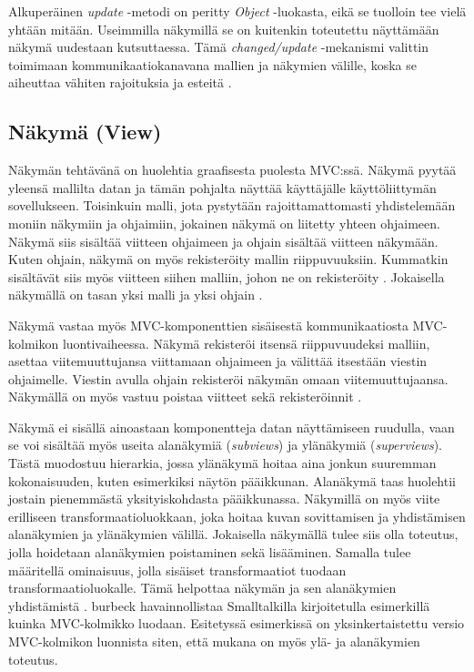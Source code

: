 \documentclass[utf8]{gradu3}
\begin{document}
Alkuperäinen \textit{update} -metodi on peritty \textit{Object} -luokasta, eikä se tuolloin tee vielä yhtään mitään. Useimmilla näkymillä se on kuitenkin toteutettu näyttämään näkymä uudestaan kutsuttaessa. Tämä \textit{changed/update} -mekanismi valittin toimimaan kommunikaatiokanavana mallien ja näkymien välille, koska se aiheuttaa vähiten rajoituksia ja esteitä \parencite{burbeck}. 

\subsection{Näkymä (View)}
Näkymän tehtävänä on huolehtia graafisesta puolesta MVC:ssä. Näkymä pyytää yleensä mallilta datan ja tämän pohjalta näyttää käyttäjälle käyttöliittymän sovellukseen. Toisinkuin malli, jota pystytään rajoittamattomasti yhdistelemään moniin näkymiin ja ohjaimiin, jokainen näkymä on liitetty yhteen ohjaimeen.  Näkymä siis sisältää viitteen ohjaimeen ja ohjain sisältää viitteen näkymään. Kuten ohjain, näkymä on myös rekisteröity mallin riippuvuuksiin. Kummatkin sisältävät siis myös viitteen siihen malliin, johon ne on rekisteröity \parencite{burbeck}. Jokaisella näkymällä on tasan yksi malli ja yksi ohjain \parencite[s. 7]{krasner_desc}.

Näkymä vastaa myös MVC-komponenttien sisäisestä kommunikaatiosta MVC-kolmikon luontivaiheessa. Näkymä rekisteröi itsensä  riippuvuudeksi malliin, asettaa viitemuuttujansa viittamaan ohjaimeen ja välittää itsestään viestin ohjaimelle. Viestin avulla ohjain rekisteröi näkymän omaan viitemuuttujaansa. Näkymällä on myös vastuu poistaa viitteet sekä rekisteröinnit \parencite{burbeck}. 

Näkymä ei sisällä ainoastaan komponentteja datan näyttämiseen ruudulla, vaan se voi sisältää myös useita alanäkymiä (\emph{subviews}) ja ylänäkymiä (\emph{superviews}). Tästä muodostuu hierarkia, jossa ylänäkymä hoitaa aina jonkun suuremman kokonaisuuden, kuten esimerkiksi näytön pääikkunan. Alanäkymä taas huolehtii jostain pienemmästä yksityiskohdasta pääikkunassa. Näkymillä on myös viite erilliseen transformaatioluokkaan, joka hoitaa kuvan sovittamisen ja yhdistämisen alanäkymien ja ylänäkymien välillä. Jokaisella näkymällä tulee siis olla toteutus, jolla hoidetaan alanäkymien poistaminen sekä lisääminen. Samalla tulee määritellä ominaisuus, jolla sisäiset transformaatiot tuodaan transformaatioluokalle. Tämä helpottaa näkymän ja sen alanäkymien yhdistämistä \parencite[s. 8]{krasner_desc}. burbeck havainnollistaa Smalltalkilla kirjoitetulla esimerkillä kuinka MVC-kolmikko luodaan. Esitetyssä esimerkissä on yksinkertaistettu versio MVC-kolmikon luonnista siten, että mukana on myös ylä- ja alanäkymien toteutus.
\end{document}
